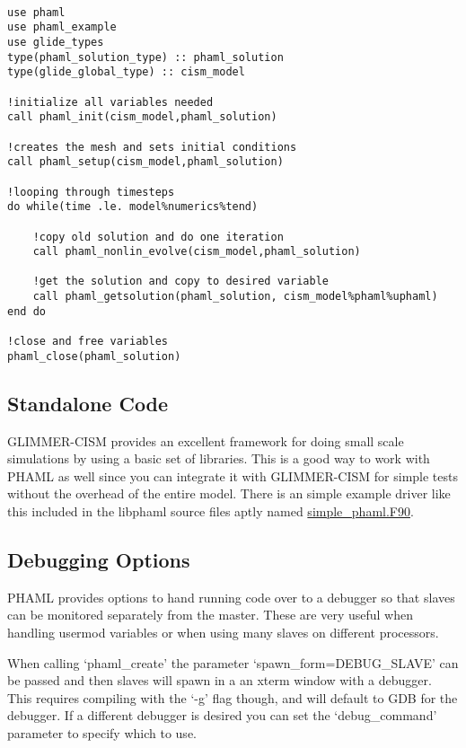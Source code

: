 \begin{framecode}{6in}
\begin{verbatim}

use phaml
use phaml_example
use glide_types
type(phaml_solution_type) :: phaml_solution
type(glide_global_type) :: cism_model

!initialize all variables needed
call phaml_init(cism_model,phaml_solution)

!creates the mesh and sets initial conditions 
call phaml_setup(cism_model,phaml_solution)

!looping through timesteps
do while(time .le. model%numerics%tend)

    !copy old solution and do one iteration
    call phaml_nonlin_evolve(cism_model,phaml_solution)
    
    !get the solution and copy to desired variable
    call phaml_getsolution(phaml_solution, cism_model%phaml%uphaml)
end do

!close and free variables
phaml_close(phaml_solution)

\end{verbatim}
\end{framecode}
\subsection{Standalone Code}

GLIMMER-CISM provides an excellent framework for doing small scale simulations by using a basic set of libraries.  This is a good way to work with PHAML as well since you can integrate it with GLIMMER-CISM for simple tests without the overhead of the entire model.  There is an simple example driver like this included in the libphaml source files aptly named \href{http://svn.berlios.de/svnroot/repos/glimmer-cism/glimmer-cism2/libphaml/simple\_phaml.F90}{simple\_phaml.F90}. 

\subsection{Debugging Options}

PHAML provides options to hand running code over to a debugger so that slaves can be monitored separately from the master.  These are very useful when handling usermod variables or when using many slaves on different processors.  

When calling `phaml\_create' the parameter `spawn\_form=DEBUG\_SLAVE' can be passed and then slaves will spawn in a an xterm window with a debugger.  This requires compiling with the `-g' flag though, and will default to GDB for the debugger.  If a different debugger is desired you can set the `debug\_command' parameter to specify which to use.
